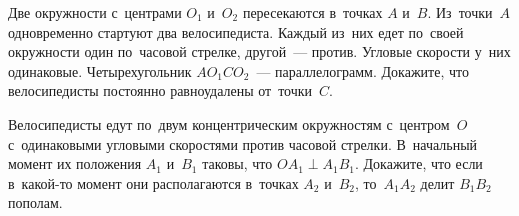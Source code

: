 \begin{problems}
\item
Две окружности с~центрами $O_1$ и~$O_2$ пересекаются в~точках $A$ и~$B$.
Из~точки~$A$ одновременно стартуют два велосипедиста.
Каждый из~них едет по~своей окружности один по~часовой стрелке,
другой~--- против.
Угловые скорости у~них одинаковые.
Четырехугольник $A O_1 C O_2$~--- параллелограмм.
Докажите, что велосипедисты постоянно равноудалены от~точки~$C$.

\item
Велосипедисты едут по~двум концентрическим окружностям с~центром~$O$
с~одинаковыми угловыми скоростями против часовой стрелки.
В~начальный момент их положения $A_1$  и~$B_1$ таковы, что
$O A_1 \perp A_1 B_1$.
Докажите, что если в~какой-то момент они располагаются в~точках $A_2$ и~$B_2$,
то~$A_1 A_2$ делит $B_1 B_2$ пополам.

\end{problems}

